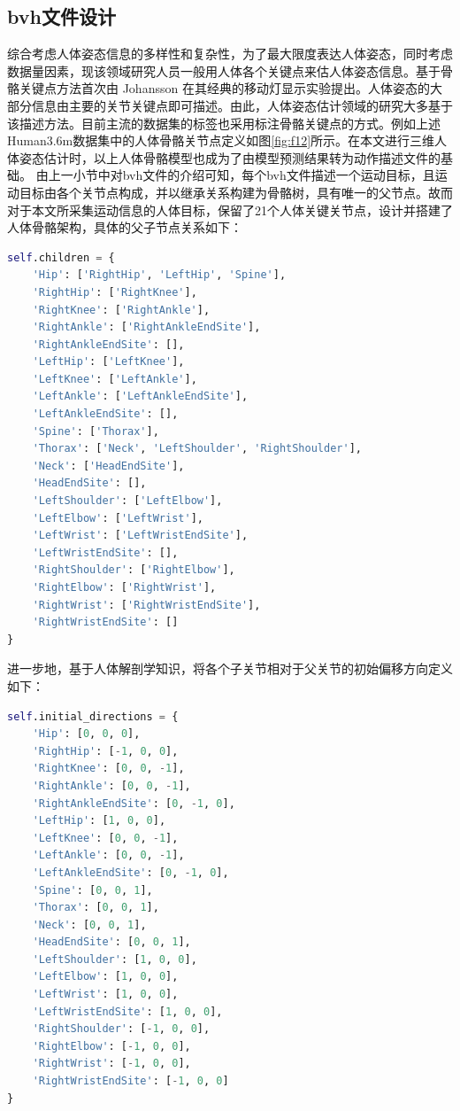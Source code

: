 \subsection{bvh文件设计}{}
综合考虑人体姿态信息的多样性和复杂性，为了最大限度表达人体姿态，同时考虑数据量因素，现该领域研究人员一般用人体各个关键点来估人体姿态信息。基于骨骼关键点方法首次由  Johansson 在其经典的移动灯显示实验提出。人体姿态的大部分信息由主要的关节关键点即可描述。由此，人体姿态估计领域的研究大多基于该描述方法。目前主流的数据集的标签也采用标注骨骼关键点的方式。例如上述Human3.6m数据集中的人体骨骼关节点定义如图\ref{fig:f12}所示。在本文进行三维人体姿态估计时，以上人体骨骼模型也成为了由模型预测结果转为动作描述文件的基础。
由上一小节中对bvh文件的介绍可知，每个bvh文件描述一个运动目标，且运动目标由各个关节点构成，并以继承关系构建为骨骼树，具有唯一的父节点。故而对于本文所采集运动信息的人体目标，保留了21个人体关键关节点，设计并搭建了人体骨骼架构，具体的父子节点关系如下：

\begin{lstlisting}[language=python, label={lst:children}]
 self.children = {
    'Hip': ['RightHip', 'LeftHip', 'Spine'],
    'RightHip': ['RightKnee'],
    'RightKnee': ['RightAnkle'],
    'RightAnkle': ['RightAnkleEndSite'],
    'RightAnkleEndSite': [],
    'LeftHip': ['LeftKnee'],
    'LeftKnee': ['LeftAnkle'],
    'LeftAnkle': ['LeftAnkleEndSite'],
    'LeftAnkleEndSite': [],
    'Spine': ['Thorax'],
    'Thorax': ['Neck', 'LeftShoulder', 'RightShoulder'],
    'Neck': ['HeadEndSite'],
    'HeadEndSite': [],
    'LeftShoulder': ['LeftElbow'],
    'LeftElbow': ['LeftWrist'],
    'LeftWrist': ['LeftWristEndSite'],
    'LeftWristEndSite': [],
    'RightShoulder': ['RightElbow'],
    'RightElbow': ['RightWrist'],
    'RightWrist': ['RightWristEndSite'],
    'RightWristEndSite': []
}
\end{lstlisting}
进一步地，基于人体解剖学知识，将各个子关节相对于父关节的初始偏移方向定义如下：
\begin{lstlisting}[language=python, label={lst:direction}]
self.initial_directions = {
    'Hip': [0, 0, 0],
    'RightHip': [-1, 0, 0],
    'RightKnee': [0, 0, -1],
    'RightAnkle': [0, 0, -1],
    'RightAnkleEndSite': [0, -1, 0],
    'LeftHip': [1, 0, 0],
    'LeftKnee': [0, 0, -1],
    'LeftAnkle': [0, 0, -1],
    'LeftAnkleEndSite': [0, -1, 0],
    'Spine': [0, 0, 1],
    'Thorax': [0, 0, 1],
    'Neck': [0, 0, 1],
    'HeadEndSite': [0, 0, 1],
    'LeftShoulder': [1, 0, 0],
    'LeftElbow': [1, 0, 0],
    'LeftWrist': [1, 0, 0],
    'LeftWristEndSite': [1, 0, 0],
    'RightShoulder': [-1, 0, 0],
    'RightElbow': [-1, 0, 0],
    'RightWrist': [-1, 0, 0],
    'RightWristEndSite': [-1, 0, 0]
}
\end{lstlisting}

